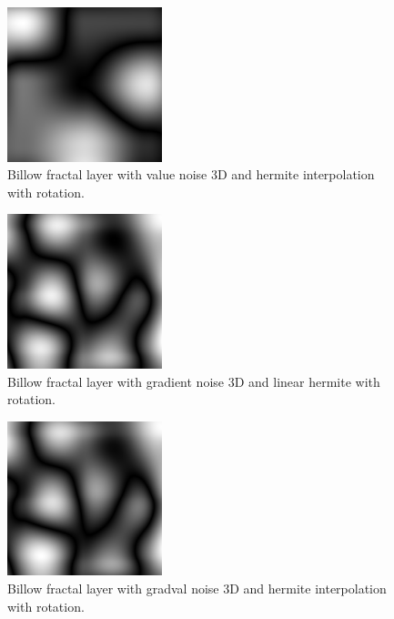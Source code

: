 \begin{figure}[h]
\centering
\includegraphics[width=0.4\textwidth]{out/simpleBillowLayer3/simpleBillowLayer3_value_noise3D_hermiteInterp_rot.png}
\caption{Billow fractal layer with value noise 3D and hermite interpolation with rotation.}
\label{fig:billow_fractal_layer3_value_noise3D_hermiteInterp_rot}
\end{figure}

\begin{figure}[h]
\centering
\includegraphics[width=0.4\textwidth]{out/simpleBillowLayer3/simpleBillowLayer3_gradient_noise3D_hermiteInterp_rot.png}
\caption{Billow fractal layer with gradient noise 3D and linear hermite with rotation.}
\label{fig:billow_fractal_layer3_gradient_noise3D_hermiteInterp_rot}
\end{figure}

\begin{figure}[h]
\centering
\includegraphics[width=0.4\textwidth]{out/simpleBillowLayer3/simpleBillowLayer3_gradval_noise3D_hermiteInterp_rot.png}
\caption{Billow fractal layer with gradval noise 3D and hermite interpolation with rotation.}
\label{fig:billow_fractal_layer3_gradval_noise3D_hermiteInterp_rot}
\end{figure}

